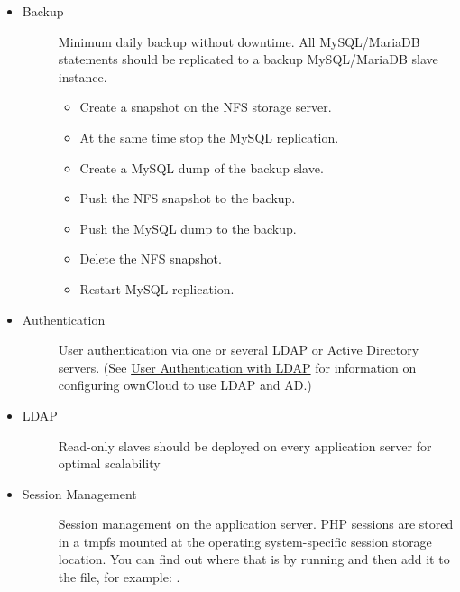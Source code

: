 \documentclass[letterpaper,10pt,english]{sphinxmanual}
\begin{document}
\begin{itemize}
\begin{description}
\end{description}

\item {} \begin{description}
\item[{Backup}] \leavevmode
Minimum daily backup without downtime. All MySQL/MariaDB statements should
be replicated to a backup MySQL/MariaDB slave instance.
\begin{itemize}
\item {} 
Create a snapshot on the NFS storage server.

\item {} 
At the same time stop the MySQL replication.

\item {} 
Create a MySQL dump of the backup slave.

\item {} 
Push the NFS snapshot to the backup.

\item {} 
Push the MySQL dump to the backup.

\item {} 
Delete the NFS snapshot.

\item {} 
Restart MySQL replication.

\end{itemize}

\end{description}

\item {} \begin{description}
\item[{Authentication}] \leavevmode
User authentication via one or several LDAP or Active Directory servers.
(See \href{https://doc.owncloud.org/server/9.0/admin\_manual/configuration\_user/user\_auth\_ldap.html}{User Authentication with LDAP}  for information on configuring
ownCloud to use LDAP and AD.)

\end{description}

\item {} \begin{description}
\item[{LDAP}] \leavevmode
Read-only slaves should be deployed on every application server for
optimal scalability

\end{description}

\item {} \begin{description}
\item[{Session Management}] \leavevmode
Session management on the application server. PHP sessions are stored
in a tmpfs mounted at the operating system-specific session storage
location. You can find out where that is by running  and then add it to the  file,
for example:
.


\end{description}
\end{itemize}
\end{document}
